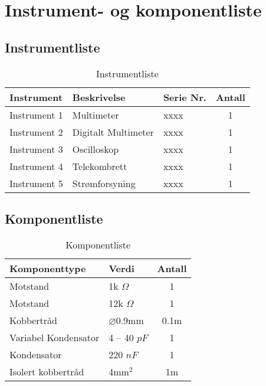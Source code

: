 \section{Instrument- og komponentliste}

\subsection{Instrumentliste}
\begin{table}[h]
    \centering
    \caption{Instrumentliste}
    \label{tab:instrumentliste}
    \begin{tabular}{|l|l|l|c|}
        \hline
        \rowcolor[gray]{0.9}
        \textbf{Instrument} & \textbf{Beskrivelse} & \textbf{Serie Nr.} & \textbf{Antall} \\ \hline
        Instrument 1 & Multimeter          & xxxx & 1 \\ \hline
        Instrument 2 & Digitalt Multimeter  & xxxx & 1 \\ \hline
        Instrument 3 & Oscilloskop          & xxxx & 1 \\ \hline
        Instrument 4 & Telekombrett         & xxxx & 1 \\ \hline
        Instrument 5 & Strømforsyning       & xxxx & 1 \\ \hline
    \end{tabular}
\end{table}

\subsection{Komponentliste}
\begin{table}[h]
    \centering
    \caption{Komponentliste}
    \label{tab:komponentliste}
    \begin{tabular}{|l|l|c|}
        \hline
        \rowcolor[gray]{0.9}
        \textbf{Komponenttype} & \textbf{Verdi} & \textbf{Antall} \\ \hline
        Motstand             & 1k $\Omega$        & 1 \\ \hline
        Motstand             & 12k $\Omega$       & 1 \\ \hline
        Kobbertråd           & $\varnothing$0.9mm & 0.1m \\ \hline
        Variabel Kondensator & 4 -- 40 $pF$       & 1 \\ \hline
        Kondensator          & 220 $nF$           & 1 \\ \hline
        Isolert kobbertråd   & 4mm$^2$            & 1m \\ \hline
    \end{tabular}
\end{table}
